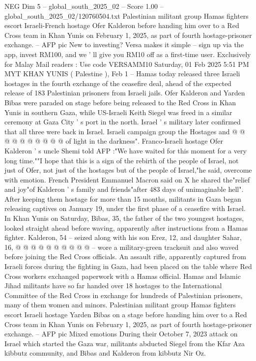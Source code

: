 \begin{textsample}{NEG Dim 5 – global\_south\_2025\_02 – Score 1.00 – global\_south\_2025\_02/120760504.txt}  \label{ex:f5_neg_310}
Palestinian militant group Hamas fighters escort Israeli-French hostage Ofer Kalderon before handing him over to a Red Cross team in Khan Yunis on February 1, 2025, as part of fourth hostage-prisoner exchange. -- AFP pic New to investing?
Versa makes it simple -- sign up via the app, invest RM100, and we ' ll give you RM10 off as a first-time user.
Exclusively for Malay Mail readers : Use code VERSAMM10 Saturday, 01 Feb 2025 5:51 PM MYT KHAN YUNIS ( Palestine ), Feb 1 -- Hamas today released three Israeli hostages in the fourth exchange of the ceasefire deal, ahead of the expected release of 183 Palestinian prisoners from Israeli jails.
Ofer Kalderon and Yarden Bibas were paraded on stage before being released to the Red Cross in Khan Yunis in southern Gaza, while US-Israeli Keith Siegel was freed in a similar ceremony at Gaza City ' s port in the north.
Israel ' s military later confirmed that all three were back in Israel.
Israeli campaign group the Hostages and @ @ @ @ @ @ @ @ @ @ of light in the darkness".
Franco-Israeli hostage Ofer Kalderon ' s uncle Shemi told AFP :"We have waited for this moment for a very long time.""I hope that this is a sign of the rebirth of the people of Israel, not just of Ofer, not just of the hostages but of the people of Israel,"he said, overcome with emotion.
French President Emmanuel Macron said on X he shared the"relief and joy"of Kalderon ' s family and friends"after 483 days of unimaginable hell".
After keeping them hostage for more than 15 months, militants in Gaza began releasing captives on January 19, under the first phase of a ceasefire with Israel.
In Khan Yunis on Saturday, Bibas, 35, the father of the two youngest hostages, looked straight ahead before waving, apparently after instructions from a Hamas fighter.
Kalderon, 54 -- seized along with his son Erez, 12, and daughter Sahar, 16, @ @ @ @ @ @ @ @ @ @ -- wore a military-green tracksuit and also waved before joining the Red Cross officials.
An assault rifle, apparently captured from Israeli forces during the fighting in Gaza, had been placed on the table where Red Cross workers exchanged paperwork with a Hamas official.
Hamas and Islamic Jihad militants have so far handed over 18 hostages to the International Committee of the Red Cross in exchange for hundreds of Palestinian prisoners, many of them women and minors.
Palestinian militant group Hamas fighters escort Israeli hostage Yarden Bibas on a stage before handing him over to a Red Cross team in Khan Yunis on February 1, 2025, as part of fourth hostage-prisoner exchange. -- AFP pic Mixed emotions During their October 7, 2023 attack on Israel which started the Gaza war, militants abducted Siegel from the Kfar Aza kibbutz community, and Bibas and Kalderon from kibbutz Nir Oz.

\end{textsample}
